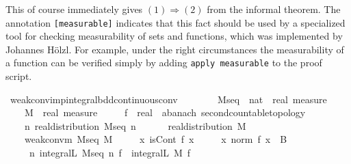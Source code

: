 \documentclass{article}
\theoremstyle{definition}
\begin{document}
\medskip

This of course immediately gives $(1) \Longrightarrow (2)$ from the informal theorem. The annotation \texttt{[measurable]} indicates that this fact should be used by a specialized tool for checking measurability of sets and functions, which was implemented by Johannes H\"olzl. For example, under the right circumstances the measurability of a function can be verified simply by adding \texttt{apply measurable} to the proof script.

\medskip

\begin{isabellebody}
\isamarkupfalse%
\ weak{\isacharunderscore}conv{\isacharunderscore}imp{\isacharunderscore}integral{\isacharunderscore}bdd{\isacharunderscore}continuous{\isacharunderscore}conv{\isacharcolon}\isanewline
\ \ \ \isanewline
\ \ \ \ M{\isacharunderscore}seq\ {\isacharcolon}{\isacharcolon}\ {\isachardoublequoteopen}nat\ {\isasymRightarrow}\ real\ measure{\isachardoublequoteclose}\ \isanewline
\ \ \ \ M\ {\isacharcolon}{\isacharcolon}\ {\isachardoublequoteopen}real\ measure{\isachardoublequoteclose}\ \isanewline
\ \ \ \ f\ {\isacharcolon}{\isacharcolon}\ {\isachardoublequoteopen}real\ {\isasymRightarrow}\ {\isacharprime}a{\isacharcolon}{\isacharcolon}{\isacharbraceleft}banach{\isacharcomma}\ second{\isacharunderscore}countable{\isacharunderscore}topology{\isacharbraceright}{\isachardoublequoteclose}\isanewline
\ \ \ \isanewline
\ \ \ \ {\isachardoublequoteopen}{\isasymAnd}n{\isachardot}\ real{\isacharunderscore}distribution\ {\isacharparenleft}M{\isacharunderscore}seq\ n{\isacharparenright}{\isachardoublequoteclose}\ \ \isanewline
\ \ \ \ {\isachardoublequoteopen}real{\isacharunderscore}distribution\ M{\isachardoublequoteclose}\ \ \isanewline
\ \ \ \ {\isachardoublequoteopen}weak{\isacharunderscore}conv{\isacharunderscore}m\ M{\isacharunderscore}seq\ M{\isachardoublequoteclose}\ \isanewline
\ \ \ \ {\isachardoublequoteopen}{\isasymAnd}x{\isachardot}\ isCont\ f\ x{\isachardoublequoteclose}\ \isanewline
\ \ \ \ {\isachardoublequoteopen}{\isasymAnd}x{\isachardot}\ norm\ {\isacharparenleft}f\ x{\isacharparenright}\ {\isasymle}\ B{\isachardoublequoteclose}\isanewline
\ \ \ \isanewline
\ \ \ \ {\isachardoublequoteopen}{\isacharparenleft}{\isasymlambda}\ n{\isachardot}\ integral\isactrlsup L\ {\isacharparenleft}M{\isacharunderscore}seq\ n{\isacharparenright}\ f{\isacharparenright}\ {\isacharminus}{\isacharminus}{\isacharminus}{\isacharminus}{\isachargreater}\ integral\isactrlsup L\ M\ f{\isachardoublequoteclose}\isanewline

\end{isabellebody}
\end{document}
